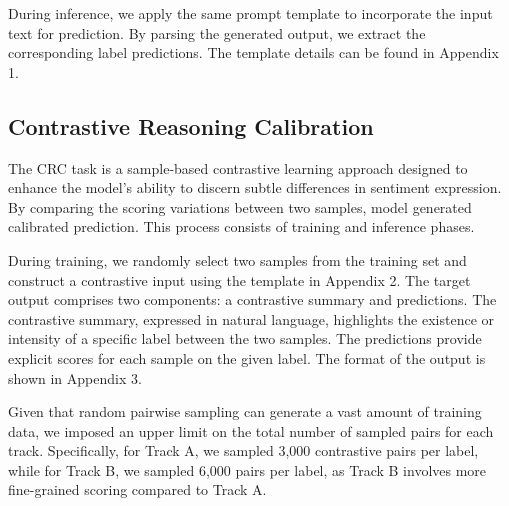 \documentclass[11pt]{article}
\begin{document}
During inference, we apply the same prompt template to incorporate the input text for prediction. By parsing the generated output, we extract the corresponding label predictions. The template details can be found in Appendix 1.

\subsection{Contrastive Reasoning Calibration}
The CRC task is a sample-based contrastive learning approach designed to enhance the model’s ability to discern subtle differences in sentiment expression. By comparing the scoring variations between two samples, model generated calibrated prediction. This process consists of training and inference phases.


During training, we randomly select two samples from the training set and construct a contrastive input using the template in Appendix 2. The target output comprises two components: a contrastive summary and predictions. The contrastive summary, expressed in natural language, highlights the  existence or intensity of a specific label between the two samples. The predictions provide explicit scores for each sample on the given label. The format of the output is shown in Appendix 3.


Given that random pairwise sampling can generate a vast amount of training data, we imposed an upper limit on the total number of sampled pairs for each track. Specifically, for Track A, we sampled 3,000 contrastive pairs per label, while for Track B, we sampled 6,000 pairs per label, as Track B involves more fine-grained scoring compared to Track A.

\end{document}
